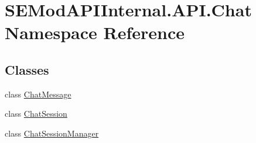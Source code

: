 \hypertarget{namespace_s_e_mod_a_p_i_internal_1_1_a_p_i_1_1_chat}{}\section{S\+E\+Mod\+A\+P\+I\+Internal.\+A\+P\+I.\+Chat Namespace Reference}
\label{namespace_s_e_mod_a_p_i_internal_1_1_a_p_i_1_1_chat}
\subsection*{Classes}
\begin{DoxyCompactItemize}
\item 
class \hyperlink{class_s_e_mod_a_p_i_internal_1_1_a_p_i_1_1_chat_1_1_chat_message}{Chat\+Message}
\item 
class \hyperlink{class_s_e_mod_a_p_i_internal_1_1_a_p_i_1_1_chat_1_1_chat_session}{Chat\+Session}
\item 
class \hyperlink{class_s_e_mod_a_p_i_internal_1_1_a_p_i_1_1_chat_1_1_chat_session_manager}{Chat\+Session\+Manager}
\end{DoxyCompactItemize}
